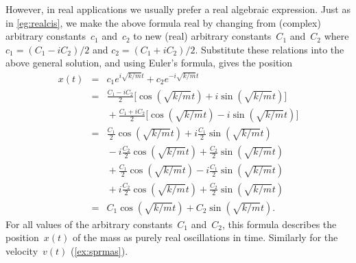 \begin{example}
\begin{solution}
However, in real applications we usually prefer a real algebraic expression.
Just as in \autoref{eg:realcis}, we make the above formula real by changing from (complex) arbitrary constants~\(c_1\) and~\(c_2\) to new (real) arbitrary constants~\(C_1\) and~\(C_2\) where \(c_1=(C_1-iC_2)/2\) and \(c_2=(C_1+iC_2)/2\).
Substitute these relations into the above general solution, and using Euler's formula, gives the position
\begin{eqnarray*}
x(t)&=&c_1e^{i\sqrt{k/m}t}+c_2e^{-i\sqrt{k/m}t}
\\&=&\frac{C_1-iC_2}2\big[\cos(\sqrt{k/m}t)+i\sin(\sqrt{k/m}t)\big]
\\&&{}
+\frac{C_1+iC_2}2\big[\cos(\sqrt{k/m}t)-i\sin(\sqrt{k/m}t)\big]
\\&=&
\frac{C_1}2\cos(\sqrt{k/m}t)+i\frac{C_1}2\sin(\sqrt{k/m}t)
\\&&{}
-i\frac{C_2}2\cos(\sqrt{k/m}t)+\frac{C_2}2\sin(\sqrt{k/m}t)
\\&&{}
+\frac{C_1}2\cos(\sqrt{k/m}t)-i\frac{C_1}2\sin(\sqrt{k/m}t)
\\&&{}
+i\frac{C_2}2\cos(\sqrt{k/m}t)+\frac{C_2}2\sin(\sqrt{k/m}t)
\\&=&C_1\cos(\sqrt{k/m}t)+C_2\sin(\sqrt{k/m}t).
\end{eqnarray*}
For all values of the arbitrary constants~\(C_1\) and~\(C_2\), this formula describes the position~\(x(t)\) of the mass as purely real oscillations in time.
Similarly for the velocity~\(v(t)\) (\autoref{ex:sprmas}).
\end{solution}
\end{example}







\begin{comment}
Probable section includes Cayley--Hamilton theorem: recall \autoref{sec:mpmev}, compute powers of matrices, then C-H.
Other applications include Markov chains.

Possibly develop a little more theory on similarity of matrices and coordinate transform of matrices.  Then Jordan form and solving non-diagonalisable systems of differential equations.

Possibly something on {Emergent quasi-stationary dynamics of metastable states} but perhaps done in 7.1.2--3. (Can one have too many buzz-words?)
\end{comment}















